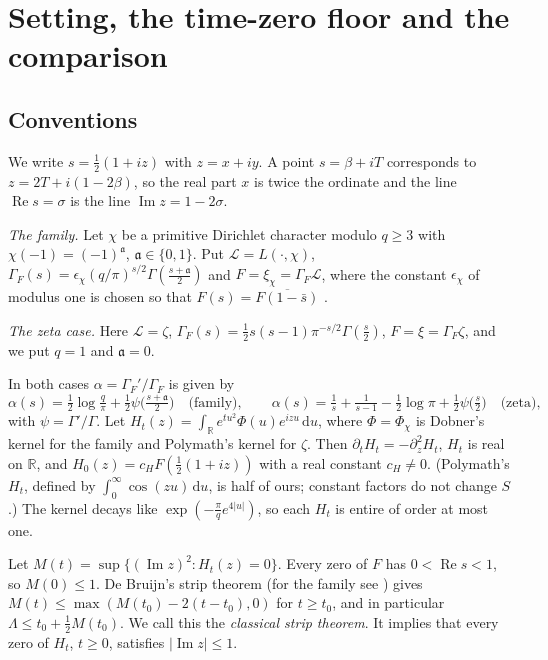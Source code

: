 \documentclass[11pt]{article}
\theoremstyle{definition}
\theoremstyle{remark}
\newcommand{\R}{\mathbb R}
\newcommand{\dd}{\,\mathrm d}
\newcommand{\cL}{\mathcal L}
\newcommand{\fa}{\mathfrak a}
\newcommand{\re}{\operatorname{Re}}
\newcommand{\im}{\operatorname{Im}}
\numberwithin{equation}{section}
\begin{document}
\section{Setting, the time-zero floor and the comparison}\label{sec:setting}

\subsection{Conventions}\label{sec:conventions}

We write $s=\frac12(1+iz)$ with $z=x+iy$. A point $s=\beta+iT$ corresponds
to $z=2T+i(1-2\beta)$, so the real part $x$ is twice the ordinate and the
line $\re s=\sigma$ is the line $\im z=1-2\sigma$.

\emph{The family.} Let $\chi$ be a primitive Dirichlet character modulo
$q\ge3$ with $\chi(-1)=(-1)^{\fa}$, $\fa\in\{0,1\}$. Put $\cL=L(\cdot,\chi)$,
$\Gamma_F(s)=\epsilon_\chi(q/\pi)^{s/2}\Gamma(\frac{s+\fa}2)$ and
$F=\xi_\chi=\Gamma_F\cL$, where the constant $\epsilon_\chi$ of modulus one
is chosen so that $F(s)=\overline{F(1-\bar s)}$ \cite{dobner}.

\emph{The zeta case.} Here $\cL=\zeta$,
$\Gamma_F(s)=\frac12s(s-1)\pi^{-s/2}\Gamma(\frac s2)$, $F=\xi=\Gamma_F\zeta$,
and we put $q=1$ and $\fa=0$.

In both cases $\alpha=\Gamma_F'/\Gamma_F$ is given by
\begin{equation}\label{eq:alpha}
\alpha(s)=\tfrac12\log\tfrac q\pi+\tfrac12\psi\bigl(\tfrac{s+\fa}2\bigr)\quad\text{(family)},\qquad
\alpha(s)=\tfrac1s+\tfrac1{s-1}-\tfrac12\log\pi+\tfrac12\psi\bigl(\tfrac s2\bigr)\quad\text{(zeta)},
\end{equation}
with $\psi=\Gamma'/\Gamma$. Let
$H_t(z)=\int_\R e^{tu^2}\Phi(u)e^{izu}\dd u$, where $\Phi=\Phi_\chi$ is
Dobner's kernel \cite{dobner} for the family and Polymath's kernel
\cite{polymath} for $\zeta$. Then $\partial_tH_t=-\partial_z^2H_t$, $H_t$
is real on $\R$, and $H_0(z)=c_HF(\frac12(1+iz))$ with a real constant
$c_H\ne0$. (Polymath's $H_t$, defined by $\int_0^\infty\cos(zu)\dd u$, is
half of ours; constant factors do not change $S$.) The kernel decays like
$\exp(-\frac\pi qe^{4\lvert u\rvert})$, so each $H_t$ is entire of order
at most one.

Let $M(t)=\sup\{(\im z)^2:H_t(z)=0\}$. Every zero of $F$ has
$0<\re s<1$, so $M(0)\le1$. De Bruijn's strip theorem \cite{debruijn}
(for the family see \cite{dobner}) gives $M(t)\le\max(M(t_0)-2(t-t_0),0)$
for $t\ge t_0$, and in particular $\Lambda\le t_0+\frac12M(t_0)$. We call
this the \emph{classical strip theorem}. It implies that every zero of $H_t$,
$t\ge0$, satisfies $\lvert\im z\rvert\le1$.
\end{document}
